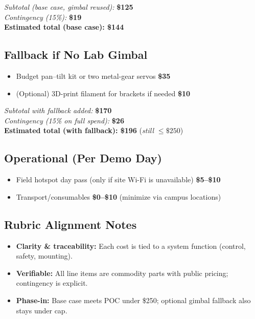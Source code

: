 \documentclass[12pt]{article}
\begin{document}
\noindent\textit{Subtotal (base case, gimbal reused):} \textbf{\$125} \\
\textit{Contingency (15\%):} \textbf{\$19} \\
\textbf{Estimated total (base case): \$144}

\subsection*{Fallback if No Lab Gimbal}
\begin{itemize}
  \item Budget pan–tilt kit or two metal-gear servos \dotfill \textbf{\$35}
  \item (Optional) 3D-print filament for brackets if needed \dotfill \textbf{\$10}
\end{itemize}

\noindent\textit{Subtotal with fallback added:} \textbf{\$170} \\
\textit{Contingency (15\% on full spend):} \textbf{\$26} \\
\textbf{Estimated total (with fallback): \$196} \quad(\textit{still $\leq\$250$})

\subsection*{Operational (Per Demo Day)}
\begin{itemize}
  \item Field hotspot day pass (only if site Wi-Fi is unavailable) \dotfill
        \textbf{\$5--\$10}
  \item Transport/consumables \dotfill \textbf{\$0--\$10} (minimize via campus
        locations)
\end{itemize}

\subsection*{Rubric Alignment Notes}
\begin{itemize}
  \item \textbf{Clarity \& traceability:} Each cost is tied to a system function (control, safety, mounting).
  \item \textbf{Verifiable:} All line items are commodity parts with public pricing; contingency is explicit.
  \item \textbf{Phase-in:} Base case meets POC under \$250; optional gimbal fallback also stays under cap.
\end{itemize}
\end{document}
